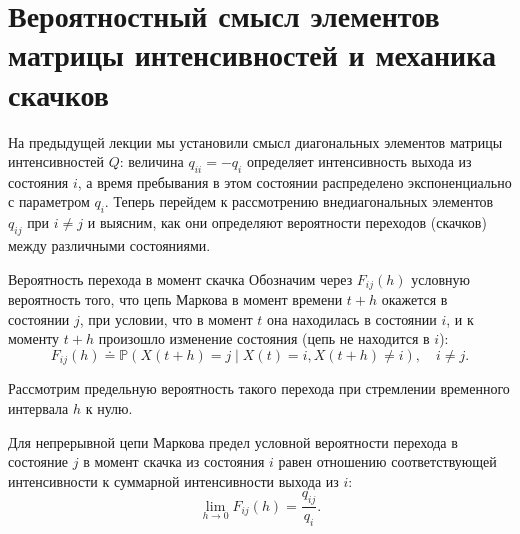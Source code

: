 
\section{Вероятностный смысл элементов матрицы интенсивностей и механика скачков}

На предыдущей лекции мы установили смысл диагональных элементов матрицы интенсивностей $Q$: величина $q_{ii} = -q_i$ определяет интенсивность выхода из состояния $i$, а время пребывания в этом состоянии распределено экспоненциально с параметром $q_i$. Теперь перейдем к рассмотрению внедиагональных элементов $q_{ij}$ при $i \neq j$ и выясним, как они определяют вероятности переходов (скачков) между различными состояниями.

\begin{definition}{Вероятность перехода в момент скачка}
    Обозначим через $F_{ij}(h)$ условную вероятность того, что цепь Маркова в момент времени $t+h$ окажется в состоянии $j$, при условии, что в момент $t$ она находилась в состоянии $i$, и к моменту $t+h$ произошло изменение состояния (цепь не находится в $i$):
    \begin{equation}
        F_{ij}(h) \doteq \mathbb{P}(X(t+h) = j \mid X(t) = i, X(t+h) \neq i), \quad i \neq j.
    \end{equation}
\end{definition}

Рассмотрим предельную вероятность такого перехода при стремлении временного интервала $h$ к нулю.

\begin{statement}
    Для непрерывной цепи Маркова предел условной вероятности перехода в состояние $j$ в момент скачка из состояния $i$ равен отношению соответствующей интенсивности к суммарной интенсивности выхода из $i$:
    \begin{equation}
        \lim_{h \to 0} F_{ij}(h) = \frac{q_{ij}}{q_i}.
    \end{equation}
\end{statement}

